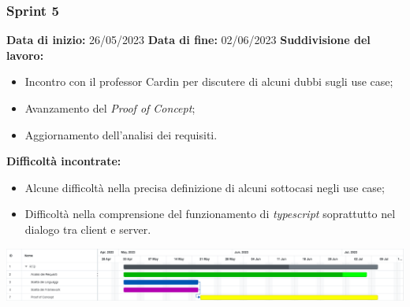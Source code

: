 \documentclass[a4paper, 12pt]{article}
\begin{document}
\newpage

\subsubsection{Sprint 5}
\textbf{Data di inizio:} 26/05/2023\newline
\textbf{Data di fine:} 02/06/2023\newline
\newline
\textbf{Suddivisione del lavoro:}
\begin{itemize}
    \item Incontro con il professor Cardin per discutere di alcuni dubbi sugli use case;
    \item Avanzamento del \textit{Proof of Concept};
    \item Aggiornamento dell'analisi dei requisiti.
\end{itemize}
\textbf{Difficoltà incontrate:}
\begin{itemize}
    \item Alcune difficoltà nella precisa definizione di alcuni sottocasi negli use case;
    \item Difficoltà nella comprensione del funzionamento di \textit{typescript} soprattutto nel dialogo tra client e server.
\end{itemize}
\includegraphics[scale=0.24]{RTB_4.png}\newline
\newline
\end{document}
